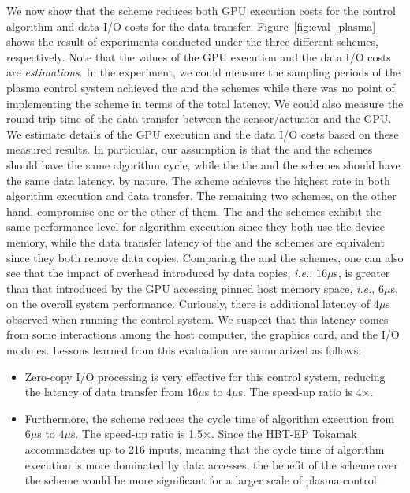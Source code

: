 We now show that the {\dm} scheme reduces both GPU execution costs
for the control algorithm and data I/O costs for the data transfer.
Figure~\ref{fig:eval_plasma} shows the result of experiments conducted
under the three different schemes, respectively.
Note that the values of the GPU execution and the data I/O costs are
\textit{estimations}.
In the experiment, we could measure the sampling periods of the plasma
control system achieved the {\dm} and the {\hp} schemes while there was
no point of implementing the {\hd} scheme in terms of the total latency.
We could also measure the round-trip time of the data transfer between
the sensor/actuator and the GPU.
We estimate details of the GPU execution and the data I/O costs based on
these measured results.
In particular, our assumption is that the {\dm} and the {\hd} schemes
should have the same algorithm cycle, while the the {\dm} and the {\hp}
schemes should have the same data latency, by nature.
The {\dm} scheme achieves the highest rate in both algorithm
execution and data transfer.
The remaining two schemes, on the other hand, compromise one or the
other of them.
The {\hd} and the {\dm} schemes exhibit the same performance level for
algorithm execution since they both use the device memory, while the
data transfer latency of the {\hp} and the {\dm} schemes are equivalent
since they both remove data copies.
Comparing the {\hd} and the {\hp} schemes, one can also see that the
impact of overhead introduced by data copies, \textit{i.e.}, $16\mu$s, is
greater than that introduced by the GPU accessing pinned host memory
space, \textit{i.e.}, $6\mu$s, on the overall system performance.
Curiously, there is additional latency of $4\mu$s observed when running
the control system.
We suspect that this latency comes from some interactions among the host
computer, the graphics card, and the I/O modules.
Lessons learned from this evaluation are summarized as follows:
\begin{itemize} \itemsep1pt
 \item Zero-copy I/O processing is very effective for this control
       system, reducing the latency of data transfer from $16\mu$s to
       $4\mu$s.
       The speed-up ratio is 4$\times$.
 \item Furthermore, the {\dm} scheme reduces the cycle time of algorithm
       execution from $6\mu$s to $4\mu$s.
       The speed-up ratio is 1.5$\times$.
       Since the HBT-EP Tokamak accommodates up to 216 inputs,
       meaning that the cycle time of algorithm execution is more
       dominated by data accesses, the benefit of the {\dm} scheme over
       the {\hp} scheme would be more significant for a larger scale of
       plasma control.
\end{itemize}


